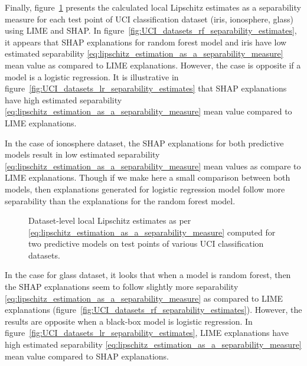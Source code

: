 \documentclass[english]{tktltiki2}
\theoremstyle{definition}
\theoremstyle{remark}
\begin{document}
Finally, figure~\ref{fig:UCI_datasets_separability_estimates} presents the calculated local Lipschitz estimates as a separability measure for each test point of UCI classification dataset (iris, ionosphere, glass) using LIME and SHAP. In figure~\ref{fig:UCI_datasets_rf_separability_estimates}, it appears that SHAP explanations for random forest model and iris have low estimated separability \eqref{eq:lipschitz_estimation_as_a_separability_measure} mean value as compared to LIME explanations. However, the case is opposite if a model is a logistic regression. It is illustrative in figure~\ref{fig:UCI_datasets_lr_separability_estimates} that SHAP explanations have high estimated separability \eqref{eq:lipschitz_estimation_as_a_separability_measure} mean value compared to LIME explanations.

In the case of ionosphere dataset, the SHAP explanations for both predictive models result in low estimated separability \eqref{eq:lipschitz_estimation_as_a_separability_measure} mean values as compare to LIME explanations. Though if we make here a small comparison between both models, then explanations generated for logistic regression model follow more separability than the explanations for the random forest model.

\begin{figure}[H]
	\hspace*{\fill}%
	\caption{Dataset-level local Lipschitz estimates as per \eqref{eq:lipschitz_estimation_as_a_separability_measure} computed for two predictive models on test points of various UCI classification datasets.}%
	\label{fig:UCI_datasets_separability_estimates}%
\end{figure}

In the case for glass dataset, it looks that when a model is random forest, then the SHAP explanations seem to follow slightly more separability \eqref{eq:lipschitz_estimation_as_a_separability_measure}  as compared to LIME explanations (figure~\ref{fig:UCI_datasets_rf_separability_estimates}). However, the results are opposite when a black-box model is logistic regression. In figure~\ref{fig:UCI_datasets_lr_separability_estimates}, LIME explanations have high estimated separability \eqref{eq:lipschitz_estimation_as_a_separability_measure}  mean value compared to SHAP explanations.
\end{document}
